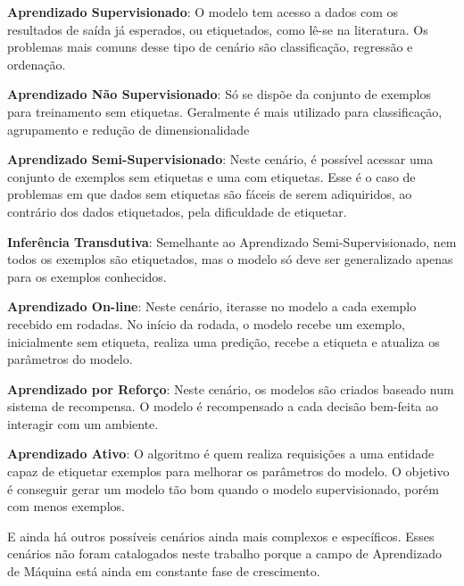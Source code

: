 \begin{description}
\item \textbf{Aprendizado Supervisionado}: O modelo tem acesso a dados com os resultados de saída já esperados, ou etiquetados, como lê-se na literatura. Os problemas mais comuns desse tipo de cenário são classificação, regressão e ordenação.

\item \textbf{Aprendizado Não Supervisionado}: Só se dispõe da conjunto de exemplos para treinamento sem etiquetas. Geralmente é mais utilizado para classificação, agrupamento e redução de dimensionalidade

\item \textbf{Aprendizado Semi-Supervisionado}: Neste cenário, é possível acessar uma conjunto de exemplos sem etiquetas e uma com etiquetas. Esse é o caso de problemas em que dados sem etiquetas são fáceis de serem adiquiridos, ao contrário dos dados etiquetados, pela dificuldade de etiquetar.

\item \textbf{Inferência Transdutiva}: Semelhante ao Aprendizado Semi-Supervisionado, nem todos os exemplos são etiquetados, mas o modelo só deve ser generalizado apenas para os exemplos conhecidos.

\item \textbf{Aprendizado On-line}: Neste cenário, iterasse no modelo a cada exemplo recebido em rodadas. No início da rodada, o modelo recebe um exemplo, inicialmente sem etiqueta, realiza uma predição, recebe a etiqueta e atualiza os parâmetros do modelo.

\item \textbf{Aprendizado por Reforço}: Neste cenário, os modelos são criados baseado num sistema de recompensa. O modelo é recompensado a cada decisão bem-feita ao interagir com um ambiente.

\item \textbf{Aprendizado Ativo}: O algoritmo é quem realiza requisições a uma entidade capaz de etiquetar exemplos para melhorar os parâmetros do modelo. O objetivo é conseguir gerar um modelo tão bom quando o modelo supervisionado, porém com menos exemplos.

\end{description}

E ainda há outros possíveis cenários ainda mais complexos e específicos. Esses cenários não foram catalogados neste trabalho porque a campo de Aprendizado de Máquina está ainda em constante fase de crescimento.

